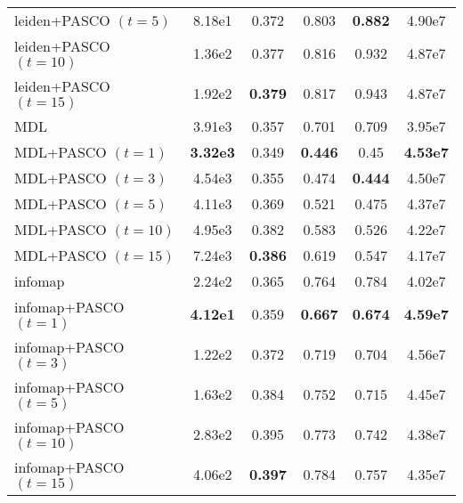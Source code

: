 \begin{tabular}{lccccc}
leiden+PASCO $(t=5)$ & 8.18e1 & 0.372 & 0.803 & \textbf{0.882} & 4.90e7 \\
leiden+PASCO $(t=10)$ & 1.36e2 & 0.377 & 0.816 & 0.932 & 4.87e7 \\
leiden+PASCO $(t=15)$ & 1.92e2 & \textbf{0.379} & 0.817 & 0.943 & 4.87e7 \\
\midrule
MDL & 3.91e3 & 0.357 & 0.701 & 0.709 & 3.95e7 \\
MDL+PASCO $(t=1)$ & \textbf{3.32e3} & 0.349 & \textbf{0.446} & 0.45 & \textbf{4.53e7} \\
MDL+PASCO $(t=3)$ & 4.54e3 & 0.355 & 0.474 & \textbf{0.444} & 4.50e7 \\
MDL+PASCO $(t=5)$ & 4.11e3 & 0.369 & 0.521 & 0.475 & 4.37e7 \\
MDL+PASCO $(t=10)$ & 4.95e3 & 0.382 & 0.583 & 0.526 & 4.22e7 \\
MDL+PASCO $(t=15)$ & 7.24e3 & \textbf{0.386} & 0.619 & 0.547 & 4.17e7 \\
\midrule
infomap & 2.24e2 & 0.365 & 0.764 & 0.784 & 4.02e7 \\
infomap+PASCO $(t=1)$ & \textbf{4.12e1} & 0.359 & \textbf{0.667} & \textbf{0.674} & \textbf{4.59e7} \\
infomap+PASCO $(t=3)$ & 1.22e2 & 0.372 & 0.719 & 0.704 & 4.56e7 \\
infomap+PASCO $(t=5)$ & 1.63e2 & 0.384 & 0.752 & 0.715 & 4.45e7 \\
infomap+PASCO $(t=10)$ & 2.83e2 & 0.395 & 0.773 & 0.742 & 4.38e7 \\
infomap+PASCO $(t=15)$ & 4.06e2 & \textbf{0.397} & 0.784 & 0.757 & 4.35e7 \\
\bottomrule
\end{tabular}